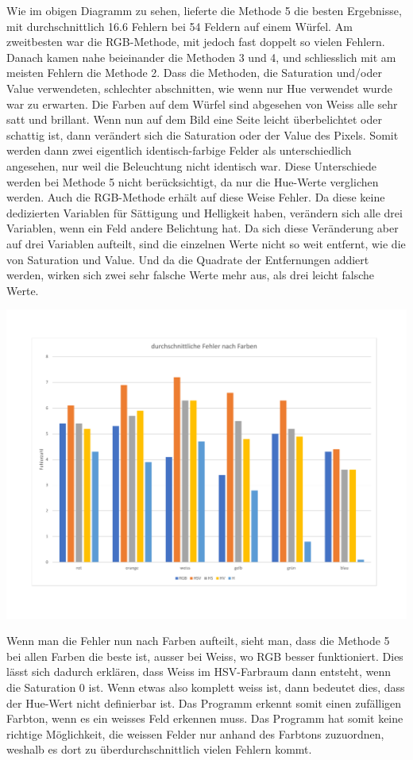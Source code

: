 \documentclass[a4paper, 12pt]{article}
\begin{document}
Wie im obigen Diagramm zu sehen, lieferte die Methode 5 die besten Ergebnisse, mit durchschnittlich 16.6 Fehlern bei 54 Feldern auf einem Würfel. Am zweitbesten war die RGB-Methode, mit jedoch fast doppelt so vielen Fehlern. Danach kamen nahe beieinander die Methoden 3 und 4, und schliesslich mit am meisten Fehlern die Methode 2. Dass die Methoden, die Saturation und/oder Value verwendeten, schlechter abschnitten, wie wenn nur Hue verwendet wurde war zu erwarten. Die Farben auf dem Würfel sind abgesehen von Weiss alle sehr satt und brillant. Wenn nun auf dem Bild eine Seite leicht überbelichtet oder schattig ist, dann verändert sich die Saturation oder der Value des Pixels. Somit werden dann zwei eigentlich identisch-farbige Felder als unterschiedlich angesehen, nur weil die Beleuchtung nicht identisch war. Diese Unterschiede werden bei Methode 5 nicht berücksichtigt, da nur die Hue-Werte verglichen werden. Auch die RGB-Methode erhält auf diese Weise Fehler. Da diese keine dedizierten Variablen für Sättigung und Helligkeit haben, verändern sich alle drei Variablen, wenn ein Feld andere Belichtung hat. Da sich diese Veränderung aber auf drei Variablen aufteilt, sind die einzelnen Werte nicht so weit entfernt, wie die von Saturation und Value. Und da die Quadrate der Entfernungen addiert werden, wirken sich zwei sehr falsche Werte mehr aus, als drei leicht falsche Werte. 

\includegraphics[scale=0.4]{durchschnittliche_Fehler_nach_Farben}

Wenn man die Fehler nun nach Farben aufteilt, sieht man, dass die Methode 5 bei allen Farben die beste ist, ausser bei Weiss, wo RGB besser funktioniert. Dies lässt sich dadurch erklären, dass Weiss im HSV-Farbraum dann entsteht, wenn die Saturation 0 ist. Wenn etwas also komplett weiss ist, dann bedeutet dies, dass der Hue-Wert nicht definierbar ist. Das Programm erkennt somit einen zufälligen Farbton, wenn es ein weisses Feld erkennen muss. Das Programm hat somit keine richtige Möglichkeit, die weissen Felder nur anhand des Farbtons zuzuordnen, weshalb es dort zu überdurchschnittlich vielen Fehlern kommt. 
\end{document}
